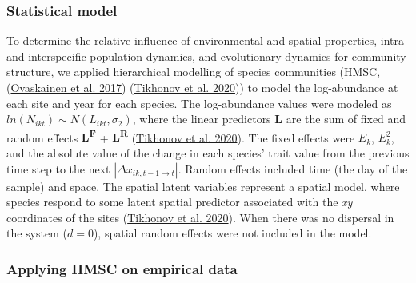 \documentclass[
]{article}
\begin{document}
\hypertarget{statistical-model}{%
\subsubsection{Statistical model}\label{statistical-model}}

To determine the relative influence of environmental and spatial properties, intra- and interspecific population dynamics, and evolutionary dynamics for community structure, we applied hierarchical modelling of species communities (HMSC, (\protect\hyperlink{ref-Ovaskainen2017HMSC}{Ovaskainen et al. 2017}) (\protect\hyperlink{ref-Tikhonov2020}{Tikhonov et al. 2020})) to model the log-abundance at each site and year for each species. The log-abundance values were modeled as \(ln(N_{ikt}) \sim N(L_{ikt},\sigma_2)\), where the linear predictors \textbf{L} are the sum of fixed and random effects \textbf{L\textsuperscript{F}} + \textbf{L\textsuperscript{R}} (\protect\hyperlink{ref-Tikhonov2020}{Tikhonov et al. 2020}). The fixed effects were \(E_k\), \(E_k^2\), and the absolute value of the change in each species' trait value from the previous time step to the next \(|\Delta x_{ik,t-1 \to t}|\). Random effects included time (the day of the sample) and space. The spatial latent variables represent a spatial model, where species respond to some latent spatial predictor associated with the \emph{xy} coordinates of the sites (\protect\hyperlink{ref-Tikhonov2020}{Tikhonov et al. 2020}). When there was no dispersal in the system (\(d=0\)), spatial random effects were not included in the model.

\hypertarget{applying-hmsc-on-empirical-data}{%
\subsubsection{Applying HMSC on empirical data}\label{applying-hmsc-on-empirical-data}}
\end{document}
